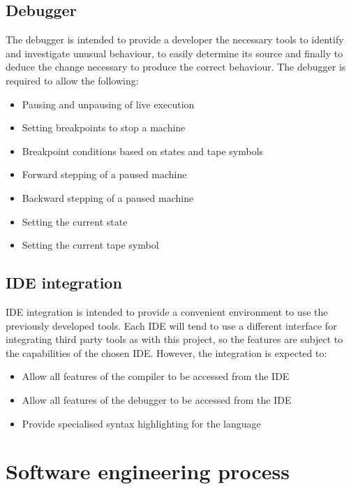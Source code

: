 \documentclass[11pt]{article}
\begin{document}
\subsection{Debugger}

The debugger is intended to provide a developer the necessary tools to identify and investigate unusual behaviour, to easily determine its source and finally to deduce the change necessary to produce the correct behaviour. The debugger is required to allow the following:

\begin{itemize}
	\item Pausing and unpausing of live execution
	\item Setting breakpoints to stop a machine
	\item Breakpoint conditions based on states and tape symbols
	\item Forward stepping of a paused machine
	\item Backward stepping of a paused machine
	\item Setting the current state
	\item Setting the current tape symbol
\end{itemize}

\subsection{IDE integration}

IDE integration is intended to provide a convenient environment to use the previously developed tools. Each IDE will tend to use a different interface for integrating third party tools as with this project, so the features are subject to the capabilities of the chosen IDE. However, the integration is expected to:

\begin{itemize}
	\item Allow all features of the compiler to be accessed from the IDE
	\item Allow all features of the debugger to be accessed from the IDE
	\item Provide specialised syntax highlighting for the language 
\end{itemize}

\section{Software engineering process}
\end{document}
